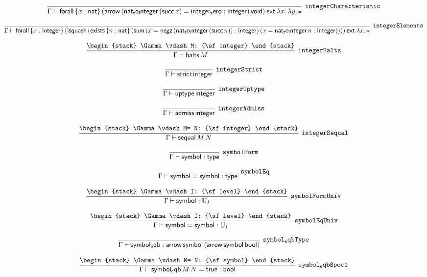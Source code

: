 \[
\infer[{\tt integerCharacteristic}]{\Gamma \vdash {\sf forall}\,\{x : {\sf nat}\}\,({\sf arrow}\,({\sf nat_to_integer}\,({\sf succ}\,x)= {\sf integer_zero}: {\sf integer})\,{\sf void})\:{\sf ext}\:\lambda x.\,\lambda y.\,\star }{}
\]

\[
\infer[{\tt integerElements}]{\Gamma \vdash {\sf forall}\,\{x : {\sf integer}\}\,({\sf isquash}\,({\sf exists}\,\{n : {\sf nat}\}\,({\sf sum}\,(x= {\sf negz}\,({\sf nat_to_integer}\,({\sf succ}\,n)): {\sf integer})\,(x= {\sf nat_to_integer}\,n: {\sf integer}))))\:{\sf ext}\:\lambda x.\,\star }{}
\]

\[
\infer[{\tt integerHalts}]{\Gamma \vdash {\sf halts}\,M}{
\begin{stack}
\Gamma \vdash M: {\sf integer}
\end{stack}}
\]

\[
\infer[{\tt integerStrict}]{\Gamma \vdash {\sf strict}\,{\sf integer}}{}
\]

\[
\infer[{\tt integerUptype}]{\Gamma \vdash {\sf uptype}\,{\sf integer}}{}
\]

\[
\infer[{\tt integerAdmiss}]{\Gamma \vdash {\sf admiss}\,{\sf integer}}{}
\]

\[
\infer[{\tt integerSequal}]{\Gamma \vdash {\sf sequal}\,M\,N}{
\begin{stack}
\Gamma \vdash M= N: {\sf integer}
\end{stack}}
\]

\[
\infer[{\tt symbolForm}]{\Gamma \vdash {\sf symbol}: {\sf type}}{}
\]

\[
\infer[{\tt symbolEq}]{\Gamma \vdash {\sf symbol}= {\sf symbol}: {\sf type}}{}
\]

\[
\infer[{\tt symbolFormUniv}]{\Gamma \vdash {\sf symbol}: {\Bbb U}_{I}}{
\begin{stack}
\Gamma \vdash I: {\sf level}
\end{stack}}
\]

\[
\infer[{\tt symbolEqUniv}]{\Gamma \vdash {\sf symbol}= {\sf symbol}: {\Bbb U}_{I}}{
\begin{stack}
\Gamma \vdash I: {\sf level}
\end{stack}}
\]

\[
\infer[{\tt symbol_eqbType}]{\Gamma \vdash {\sf symbol_eqb}: {\sf arrow}\,{\sf symbol}\,({\sf arrow}\,{\sf symbol}\,{\sf bool})}{}
\]

\[
\infer[{\tt symbol_eqbSpec1}]{\Gamma \vdash {\sf symbol_eqb}\,M\,N= {\sf true}: {\sf bool}}{
\begin{stack}
\Gamma \vdash M= N: {\sf symbol}
\end{stack}}
\]

